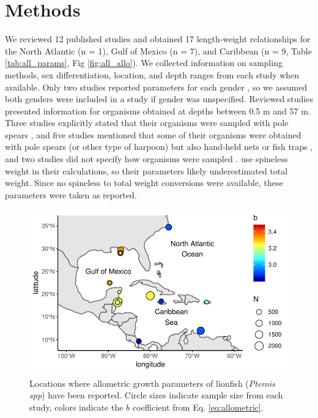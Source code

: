 \documentclass[fleqn,10pt,lineno]{wlpeerj} %
\begin{document}
\clearpage

\section*{Methods}

We reviewed 12 published studies and obtained 17 length-weight
relationships for the North Atlantic (n = 1), Gulf of Mexico (n = 7),
and Caribbean (n = 9, Table \ref{tab:all_params}, Fig
\ref{fig:all_allo}). We collected information on sampling methods, sex
differentiation, location, and depth ranges from each study when
available. Only two studies reported parameters for each gender
\citep{aguilarperera_2016,fogg_2013}, so we assumed both genders were
included in a study if gender was unspecified. Reviewed studies
presented information for organisms obtained at depths between 0.5 m and
57 m. Three studies explicitly stated that their organisms were sampled
with pole spears
\citep{dahl_2014,aguilarperera_2016,chin_2016,sabidoitz_2016}, and five
studies mentioned that some of their organisms were obtained with pole
spears (or other type of harpoon) but also hand-held nets or fish traps
\citep{barbour_2011,fogg_2013,edwards_2014,toledohernndez_2014,sandel_2015,sabidoitza_2016,sabidoitz_2016},
and two studies did not specify how organisms were sampled
\citep{darling_2011,deleon_2013}. \citet{fogg_2013} use spineless weight
in their calculations, so their parameters likely underestimated total
weight. Since no spineless to total weight conversions were available,
these parameters were taken as reported.

\begin{figure}
\centering
\includegraphics{Manuscript_files/figure-latex/map-1.pdf}
\caption{\label{fig:map}Locations where allometric growth parameters of
lionfish (\emph{Pterois spp}) have been reported. Circle sizes indicate
sample size from each study, colors indicate the \(b\) coefficient from
Eq. \ref{eq:allometric}.}
\end{figure}
\end{document}
